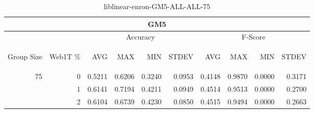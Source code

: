 \begin{center}
\begin{table}[htbp]
\begin{tabular}{ | r | r | r | r | r | r | r | r | r | r |}
\hline
\multicolumn{10}{|c|}{GM5}\\
\hline
 & & \multicolumn{4}{|c|}{Accuracy} & \multicolumn{4}{|c|}{F-Score}\\ \cline{3-10}
\begin{sideways}Group Size\end{sideways} & \begin{sideways}Web1T \%\end{sideways} & \begin{sideways}AVG\end{sideways} & \begin{sideways}MAX\end{sideways} & \begin{sideways}MIN\end{sideways} & \begin{sideways}STDEV\end{sideways} & \begin{sideways}AVG\end{sideways} & \begin{sideways}MAX\end{sideways} & \begin{sideways}MIN\end{sideways} & \begin{sideways}STDEV\end{sideways}\\
\hline
\multirow{3}{*}{75}
 & 0 & 0.5211 & 0.6206 & 0.3240 & 0.0953 & 0.4148 & 0.9870 & 0.0000 & 0.3171\\ \cline{2-10}
 & 1 & 0.6141 & 0.7194 & 0.4211 & 0.0949 & 0.4514 & 0.9513 & 0.0000 & 0.2700\\ \cline{2-10}
 & 2 & 0.6104 & 0.6739 & 0.4230 & 0.0850 & 0.4515 & 0.9494 & 0.0000 & 0.2663\\ \cline{2-10}
\hline
\end{tabular}
\caption{liblinear-enron-GM5-ALL-ALL-75}
\end{table}
\end{center}

